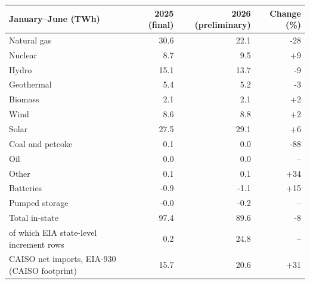 \begin{tabular}{lrrr}
\toprule
January--June (TWh) & 2025 (final) & 2026 (preliminary) & Change (\%) \\
\midrule
Natural gas & 30.6 & 22.1 & -28 \\
Nuclear & 8.7 & 9.5 & +9 \\
Hydro & 15.1 & 13.7 & -9 \\
Geothermal & 5.4 & 5.2 & -3 \\
Biomass & 2.1 & 2.1 & +2 \\
Wind & 8.6 & 8.8 & +2 \\
Solar & 27.5 & 29.1 & +6 \\
Coal and petcoke & 0.1 & 0.0 & -88 \\
Oil & 0.0 & 0.0 & -- \\
Other & 0.1 & 0.1 & +34 \\
Batteries & -0.9 & -1.1 & +15 \\
Pumped storage & -0.0 & -0.2 & -- \\
\midrule
Total in-state & 97.4 & 89.6 & -8 \\
of which EIA state-level increment rows & 0.2 & 24.8 & -- \\
CAISO net imports, EIA-930 (CAISO footprint) & 15.7 & 20.6 & +31 \\
\bottomrule
\end{tabular}